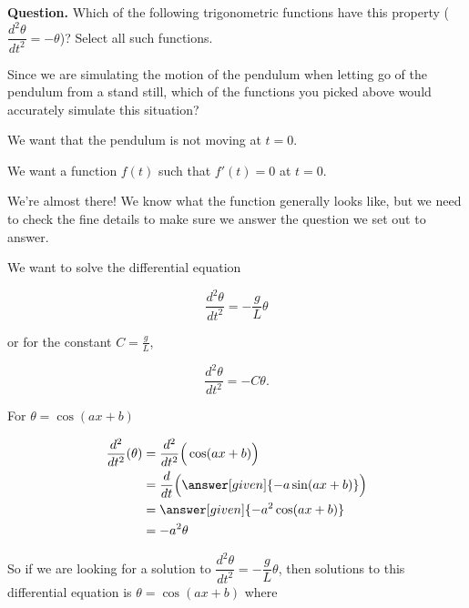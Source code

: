 \documentclass[handout,nooutcomes]{ximera}
\begin{document}
\begin{example}
\begin{explanation}
\textbf{Question.}  Which of the following trigonometric functions have this property
($\dfrac{d^2 \theta}{d t^2} = -\theta$)? Select all such functions.
\begin{selectAll}
\end{selectAll}


\begin{question}
Since we are simulating the motion of the pendulum when letting go of the pendulum from
a stand still, which of the functions you picked above would accurately simulate this situation?
\begin{selectAll}
\end{selectAll}
\begin{hint}
We want that the pendulum is not moving at $t=0$.
\end{hint}
\begin{hint}
We want a function $f(t)$ such that $f'(t) = 0$ at $t=0$.
\end{hint}
\end{question}

We're almost there! We know what the function generally looks like, but we
need to check the fine details to make sure we answer the question we set out to answer.

We want to solve the differential equation

\[
\dfrac{d^2 \theta}{d t^2}  = -\dfrac{g}{L} \theta
\]

or for the constant $C=\frac{g}{L}$,

\[
\dfrac{d^2 \theta}{d t^2}  = -C\theta.
\]

For $\theta = \cos(ax+b)$

\begin{align*}
    \dfrac{d^2}{d t^2}(\theta) &= \dfrac{d^2}{d t^2}\Big(\cos(a x + b)\Big)\\
    &= \dfrac{d}{d t} \Big( \answer[given]{- a \sin(a x+b)}\Big)\\
    &= \answer[given]{-a^2 \cos(a x+b)}\\
    &= -a^2 \theta 
\end{align*}

\begin{question}
So if we are looking for a solution to $\dfrac{d^2 \theta}{d t^2}  = -\dfrac{g}{L} \theta$,
then solutions to this differential equation is $\theta = \cos(ax+b)$ where


\end{question}
\end{explanation}
\end{example}
\end{document}
